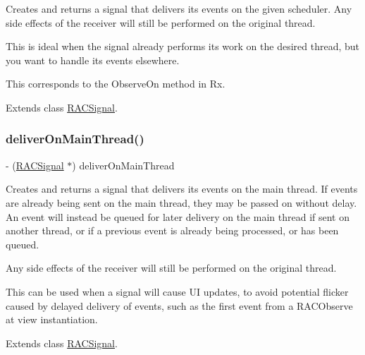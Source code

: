 Creates and returns a signal that delivers its events on the given scheduler. Any side effects of the receiver will still be performed on the original thread.

This is ideal when the signal already performs its work on the desired thread, but you want to handle its events elsewhere.

This corresponds to the {\ttfamily Observe\+On} method in Rx. 

Extends class \mbox{\hyperlink{interface_r_a_c_signal_a69e4dc1c476da42ed829caed84fbd258}{R\+A\+C\+Signal}}.

\mbox{\label{category_r_a_c_signal_07_operations_08_a0c7042ce0eb6c729bc38421295296db1}} 
\subsubsection{\texorpdfstring{deliver\+On\+Main\+Thread()}{deliverOnMainThread()}\hspace{0.1cm}{\footnotesize\ttfamily [1/3]}}
{\footnotesize\ttfamily -\/ (\mbox{\hyperlink{interface_r_a_c_signal}{R\+A\+C\+Signal}} $\ast$) deliver\+On\+Main\+Thread \begin{DoxyParamCaption}{ }\end{DoxyParamCaption}}

Creates and returns a signal that delivers its events on the main thread. If events are already being sent on the main thread, they may be passed on without delay. An event will instead be queued for later delivery on the main thread if sent on another thread, or if a previous event is already being processed, or has been queued.

Any side effects of the receiver will still be performed on the original thread.

This can be used when a signal will cause UI updates, to avoid potential flicker caused by delayed delivery of events, such as the first event from a R\+A\+C\+Observe at view instantiation. 

Extends class \mbox{\hyperlink{interface_r_a_c_signal_a0c7042ce0eb6c729bc38421295296db1}{R\+A\+C\+Signal}}.

\mbox{\label{category_r_a_c_signal_07_operations_08_a0c7042ce0eb6c729bc38421295296db1}} 
